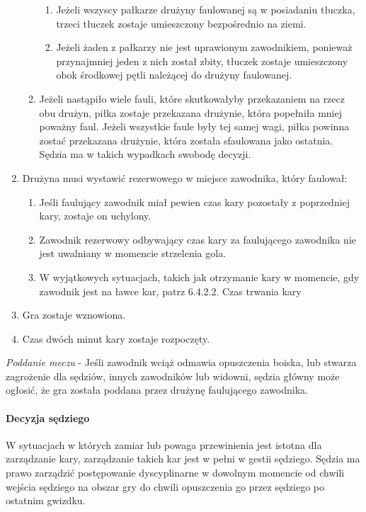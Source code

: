 \documentclass[12pt]{article}
\begin{document}
\begin{enumerate}
\begin{enumerate}
    \begin{enumerate}
    \item
            Jeżeli wszyscy pałkarze drużyny faulowanej są w posiadaniu
      tłuczka, trzeci tłuczek zostaje umieszczony bezpośrednio na ziemi.
          \item
            Jeżeli żaden z pałkarzy nie jest uprawionym zawodnikiem, ponieważ
      przynajmniej jeden z nich został zbity, tłuczek zostaje
      umieszczony obok środkowej pętli należącej do drużyny faulowanej.
          \end{enumerate}
  \item
        Jeżeli nastąpiło wiele fauli, które skutkowałyby przekazaniem na
    rzecz obu drużyn, piłka zostaje przekazana drużynie, która popełniła
    mniej poważny faul. Jeżeli wszystkie faule były tej samej wagi,
    piłka powinna zostać przekazana drużynie, która została sfaulowana
    jako ostatnia. Sędzia ma w takich wypadkach swobodę decyzji.
      \end{enumerate}
\item
    Drużyna musi wystawić rezerwowego w miejsce zawodnika, który faulował:
  
  \begin{enumerate}
  \item
        Jeśli faulujący zawodnik miał pewien czas kary pozostały z
    poprzedniej kary, zostaje on uchylony.
      \item
        Zawodnik rezerwowy odbywający czas kary za faulującego zawodnika nie
    jest uwalniany w momencie strzelenia gola.
      \item
        W wyjątkowych sytuacjach, takich jak otrzymanie kary w momencie, gdy
    zawodnik jest na ławce kar, patrz 6.4.2.2. Czas trwania kary
      \end{enumerate}
\item
    Gra zostaje wznowiona.
  \item
    Czas dwóch minut kary zostaje rozpoczęty.
  \end{enumerate}

\emph{Poddanie meczu} - Jeśli zawodnik wciąż odmawia opuszczenia boiska,
lub stwarza zagrożenie dla sędziów, innych zawodników lub widowni,
sędzia główny może ogłosić, że gra została poddana przez drużynę
faulującego zawodnika.

\paragraph{Decyzja sędziego}
W sytuacjach w których zamiar lub
powaga przewinienia jest istotna dla zarządzanie kary, zarządzanie
takich kar jest w pełni w gestii sędziego. Sędzia ma prawo zarządzić
postępowanie dyscyplinarne w dowolnym momencie od chwili wejścia
sędziego na obszar gry do chwili opuszczenia go przez sędziego po
ostatnim gwizdku.
\end{document}
